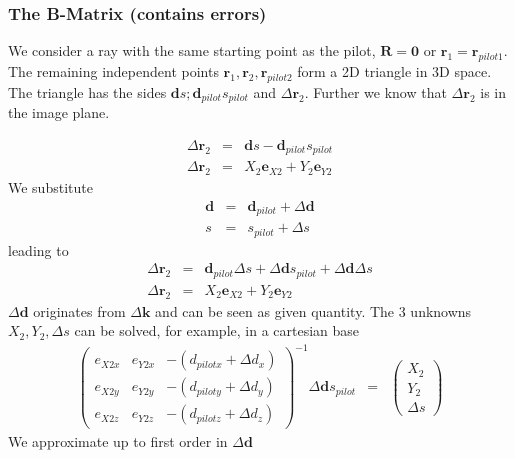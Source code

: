 \documentclass[12pt,a4paper,twoside,openright,BCOR10mm,headsepline,titlepage,abstracton,chapterprefix,final]{scrreprt}
\newcommand\Vector[1]{{\mathbf{#1}}}
\newcommand\wavenumber{k}
\newcommand\Wavevector{\Vector{\wavenumber}}
\begin{document}
\subsubsection{The B-Matrix (contains errors)}
We consider a ray with the same starting point as the pilot, $\Vector{R} = \Vector{0}$ or $\Vector{r}_{1} = \Vector{r}_{pilot1}$. 
The remaining independent points $\Vector{r}_{1}, \Vector{r}_{2}, \Vector{r}_{pilot2}$ form a 2D triangle in 3D space.
The triangle has the sides $\Vector{d} s ; \Vector{d}_{pilot} s_{pilot}$ and $\Delta \Vector{r}_2$. 
Further we know that $\Delta \Vector{r}_2$ is in the image plane.

\begin{eqnarray}
  \Delta \Vector{r}_2  &=& \Vector{d} s - \Vector{d}_{pilot} s_{pilot} \\
  \Delta \Vector{r}_2  &=& X_2 \Vector{e}_{X2} + Y_2 \Vector{e}_{Y2}
\end{eqnarray}
We substitute
\begin{eqnarray}
 \Vector{d} &=& \Vector{d}_{pilot} + \Delta \Vector{d} \\
 s &=& s_{pilot} + \Delta s
\end{eqnarray}
leading to
\begin{eqnarray}
  \Delta \Vector{r}_2  &=& \Vector{d}_{pilot} \Delta s + \Delta \Vector{d} s_{pilot} + \Delta \Vector{d} \Delta s \\
  \Delta \Vector{r}_2  &=& X_2 \Vector{e}_{X2} + Y_2 \Vector{e}_{Y2}
\end{eqnarray}
$\Delta \Vector{d}$ originates from $\Delta \Wavevector$ and can be seen as given quantity.
The 3 unknowns $X_2 , Y_2 , \Delta s$ can be solved, for example, in a cartesian base
\begin{eqnarray}
 \begin{pmatrix}
  e_{X2x} & e_{Y2x} & - ( d_{pilotx} + \Delta d_x ) \\
  e_{X2y} & e_{Y2y} & - ( d_{piloty} + \Delta d_y ) \\
  e_{X2z} & e_{Y2z} & - ( d_{pilotz} + \Delta d_z ) 
 \end{pmatrix}^{-1}
 \Delta \Vector{d} s_{pilot} &=& 
 \begin{pmatrix}
  X_2 \\ Y_2 \\ \Delta s
 \end{pmatrix} 
\end{eqnarray}
We approximate up to first order in $\Delta \Vector{d}$
\end{document}
